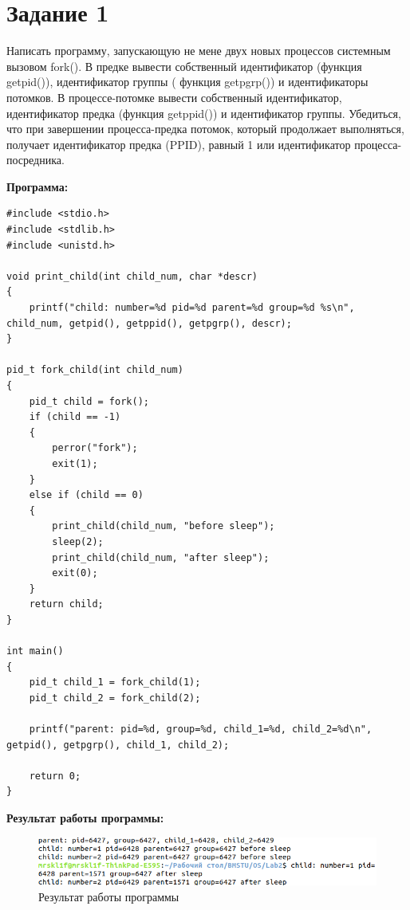 \documentclass[14pt, a4paper]{extarticle}
\begin{document}
\section*{Задание 1}
Написать программу, запускающую не мене двух новых процессов системным вызовом fork(). В предке вывести собственный идентификатор (функция getpid()), идентификатор группы ( функция getpgrp()) и идентификаторы потомков. В процессе-потомке вывести собственный идентификатор, идентификатор предка (функция getppid()) и идентификатор группы. Убедиться, что при завершении процесса-предка потомок, который продолжает выполняться, получает идентификатор предка (PPID), равный 1 или идентификатор процесса-посредника.\par
\textbf{Программа:}
\begin{lstlisting}[label=task1, caption=Задание 1]
#include <stdio.h> 
#include <stdlib.h> 
#include <unistd.h>

void print_child(int child_num, char *descr)
{
	printf("child: number=%d pid=%d parent=%d group=%d %s\n", child_num, getpid(), getppid(), getpgrp(), descr);
}

pid_t fork_child(int child_num) 
{
	pid_t child = fork();
	if (child == -1)
	{
		perror("fork");
		exit(1);
	}
	else if (child == 0) 
	{
		print_child(child_num, "before sleep");
		sleep(2);
		print_child(child_num, "after sleep");
		exit(0);
	}
	return child;
}

int main() 
{
	pid_t child_1 = fork_child(1);
	pid_t child_2 = fork_child(2);
	
	printf("parent: pid=%d, group=%d, child_1=%d, child_2=%d\n", getpid(), getpgrp(), child_1, child_2);
	
	return 0;
}
\end{lstlisting}\par
\textbf{Результат работы программы:}\par
\begin{figure}[h!]
	\centering
	\includegraphics[width=\textwidth]{source/1.png}
	\caption{Результат работы программы}
	\label{Example1}
\end{figure}\par

\clearpage
\end{document}
